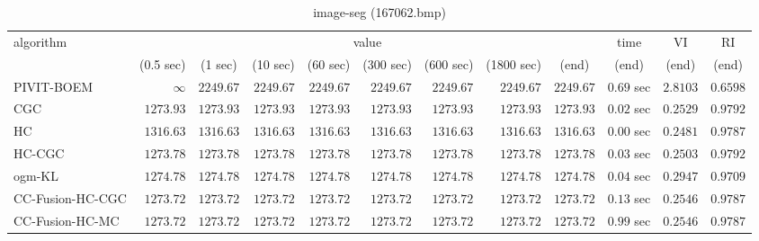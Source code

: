 \begin{table}[H]
\scriptsize
\centering
\caption{image-seg (167062.bmp)}
\label{tab:anytimetable-image-seg-167062.bmp}
\begin{tabular}{lrrrrrrrrrrr}
\toprule
           algorithm &                                   \multicolumn{8}{c}{value} & \multicolumn{1}{c}{time}    & \multicolumn{1}{c}{VI}  & \multicolumn{1}{c}{RI} \\  
\cmidrule(lr){2-9}\cmidrule(lr){10-10} \cmidrule(lr){11-11} \cmidrule(lr){12-12}   
                     & \multicolumn{1}{c}{(0.5 sec)} & \multicolumn{1}{c}{(1 sec)} & \multicolumn{1}{c}{(10 sec)} & \multicolumn{1}{c}{(60 sec)} & \multicolumn{1}{c}{(300 sec)} & \multicolumn{1}{c}{(600 sec)} & \multicolumn{1}{c}{(1800 sec)} & \multicolumn{1}{c}{(end)} & \multicolumn{1}{c}{(end)}    & \multicolumn{1}{c}{(end)}   & \multicolumn{1}{c}{(end)}  \\ \midrule 
          PIVIT-BOEM & $\infty$ & $      2249.67$ & $      2249.67$ & $      2249.67$ & $      2249.67$ & $      2249.67$ & $      2249.67$ & $      2249.67$ & $         0.69$ sec    & $       2.8103$  & $       0.6598$ \\ 
                 CGC & $      1273.93$ & $      1273.93$ & $      1273.93$ & $      1273.93$ & $      1273.93$ & $      1273.93$ & $      1273.93$ & $      1273.93$ & $         0.02$ sec    & $       0.2529$  & $       0.9792$ \\ 
                  HC & $      1316.63$ & $      1316.63$ & $      1316.63$ & $      1316.63$ & $      1316.63$ & $      1316.63$ & $      1316.63$ & $      1316.63$ & $         0.00$ sec    & $       0.2481$  & $       0.9787$ \\ 
              HC-CGC & $      1273.78$ & $      1273.78$ & $      1273.78$ & $      1273.78$ & $      1273.78$ & $      1273.78$ & $      1273.78$ & $      1273.78$ & $         0.03$ sec    & $       0.2503$  & $       0.9792$ \\ 
              ogm-KL & $      1274.78$ & $      1274.78$ & $      1274.78$ & $      1274.78$ & $      1274.78$ & $      1274.78$ & $      1274.78$ & $      1274.78$ & $         0.04$ sec    & $       0.2947$  & $       0.9709$ \\ 
    CC-Fusion-HC-CGC & $      1273.72$ & $      1273.72$ & $      1273.72$ & $      1273.72$ & $      1273.72$ & $      1273.72$ & $      1273.72$ & $      1273.72$ & $         0.13$ sec    & $       0.2546$  & $       0.9787$ \\ 
     CC-Fusion-HC-MC & $      1273.72$ & $      1273.72$ & $      1273.72$ & $      1273.72$ & $      1273.72$ & $      1273.72$ & $      1273.72$ & $      1273.72$ & $         0.99$ sec    & $       0.2546$  & $       0.9787$ \\ 

\end{tabular}
\end{table}
